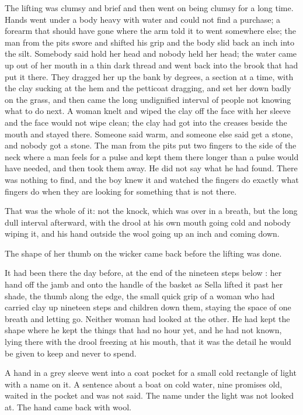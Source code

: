 The lifting was clumsy and brief and then went on being clumsy for a long time. Hands went under a body heavy with water and could not find a purchase; a forearm that should have gone where the arm told it to went somewhere else; the man from the pits swore and shifted his grip and the body slid back an inch into the silt. Somebody said hold her head and nobody held her head; the water came up out of her mouth in a thin dark thread and went back into the brook that had put it there. They dragged her up the bank by degrees, a section at a time, with the clay sucking at the hem and the petticoat dragging, and set her down badly on the grass, and then came the long undignified interval of people not knowing what to do next. A woman knelt and wiped the clay off the face with her sleeve and the face would not wipe clean; the clay had got into the creases beside the mouth and stayed there. Someone said warm, and someone else said get a stone, and nobody got a stone. The man from the pits put two fingers to the side of the neck where a man feels for a pulse and kept them there longer than a pulse would have needed, and then took them away. He did not say what he had found. There was nothing to find, and the boy knew it and watched the fingers do exactly what fingers do when they are looking for something that is not there.

That was the whole of it: not the knock, which was over in a breath, but the long dull interval afterward, with the drool at his own mouth going cold and nobody wiping it, and his hand outside the wool going up an inch and coming down.

\scenebreak

The shape of her thumb on the wicker came back before the lifting was done.

It had been there the day before, at the end of the nineteen steps below : her hand off the jamb and onto the handle of the basket as Sella lifted it past her shade, the thumb along the edge, the small quick grip of a woman who had carried clay up nineteen steps and children down them, staying the space of one breath and letting go. Neither woman had looked at the other. He had kept the shape where he kept the things that had no hour yet, and he had not known, lying there with the drool freezing at his mouth, that it was the detail he would be given to keep and never to spend.

A hand in a grey sleeve went into a coat pocket for a small cold rectangle of light with a name on it. A sentence about a boat on cold water, nine promises old, waited in the pocket and was not said. The name under the light was not looked at. The hand came back with wool.

